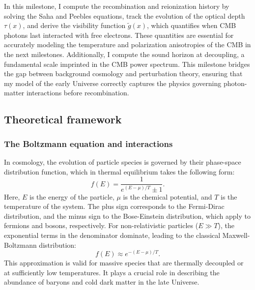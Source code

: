 \documentclass{aa}
\numberwithin{equation}{section}
\numberwithin{table}{section}
\numberwithin{figure}{section}
\begin{document}
In this milestone, I compute the recombination and reionization history by solving the Saha and Peebles equations, track the evolution of the optical depth $\tau(x)$, and derive the visibility function $\tilde{g}(x)$, which quantifies when CMB photons last interacted with free electrons. These quantities are essential for accurately modeling the temperature and polarization anisotropies of the CMB in the next milestones. Additionally, I compute the sound horizon at decoupling, a fundamental scale imprinted in the CMB power spectrum. This milestone bridges the gap between background cosmology and perturbation theory, ensuring that my model of the early Universe correctly captures the physics governing photon-matter interactions before recombination. 


\subsection{Theoretical framework}\label{subsec: II theory}

\subsubsection{The Boltzmann equation and interactions}\label{subsubsec: II theory interactions}
In cosmology, the evolution of particle species is governed by their phase-space distribution function, which in thermal equilibrium takes the following form:
\begin{equation}
f(E) = \frac{1}{e^{(E - \mu) / T} \pm 1}. \label{eq: distribution}
\end{equation}
Here, $E$ is the energy of the particle, $\mu$ is the chemical potential, and $T$ is the temperature of the system. The plus sign corresponds to the Fermi-Dirac distribution, and the minus sign to the Bose-Einstein distribution, which apply to fermions and bosons, respectively. For non-relativistic particles ($E \gg T$), the exponential terms in the denominator dominate, leading to the classical Maxwell-Boltzmann distribution:
\begin{equation}
f(E) \approx e^{-(E - \mu) / T}. \label{eq: Maxwell}
\end{equation}
This approximation is valid for massive species that are thermally decoupled or at sufficiently low temperatures. It plays a crucial role in describing the abundance of baryons and cold dark matter in the late Universe.
\end{document}
